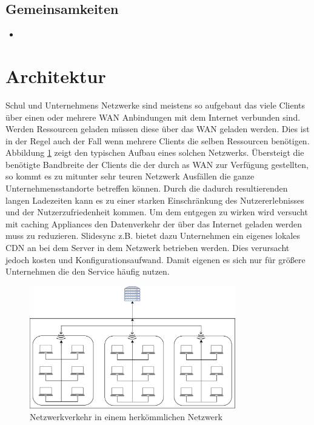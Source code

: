\subsection{Gemeinsamkeiten}

\begin{itemize}
	\item 
\end{itemize}

\section{Architektur}

Schul und Unternehmens Netzwerke sind meistens so aufgebaut das viele Clients über einen oder mehrere WAN Anbindungen mit dem Internet verbunden sind. Werden Ressourcen geladen müssen diese über das WAN geladen werden. Dies ist in der Regel auch der Fall wenn mehrere Clients die selben Ressourcen benötigen. Abbildung \ref{fig:school} zeigt den typischen Aufbau eines solchen Netzwerks. Übersteigt die benötigte Bandbreite der Clients die der durch as WAN zur Verfügung gestellten, so kommt es zu mitunter sehr teuren Netzwerk Ausfällen die ganze Unternehmensstandorte betreffen können. Durch die dadurch resultierenden langen Ladezeiten kann es zu einer starken Einschränkung des Nutzererlebnisses und der Nutzerzufriedenheit kommen.\cite{userWaitingTime} Um dem entgegen zu wirken wird versucht mit caching Appliances den Datenverkehr der über das Internet geladen werden muss zu reduzieren. Slidesync z.B. bietet dazu Unternehmen ein eigenes lokales CDN an bei dem Server in dem Netzwerk betrieben werden. Dies verursacht jedoch kosten und Konfigurationsaufwand. Damit eigenen es sich nur für größere Unternehmen die den Service häufig nutzen.

\begin{figure}[!h]
	\centering
	\includegraphics[width=0.8\textwidth]{figures/network_current}
	\caption[A Figure Short-Title]{Netzwerkverkehr in einem herkömmlichen Netzwerk}
	\label{fig:school}
\end{figure}

